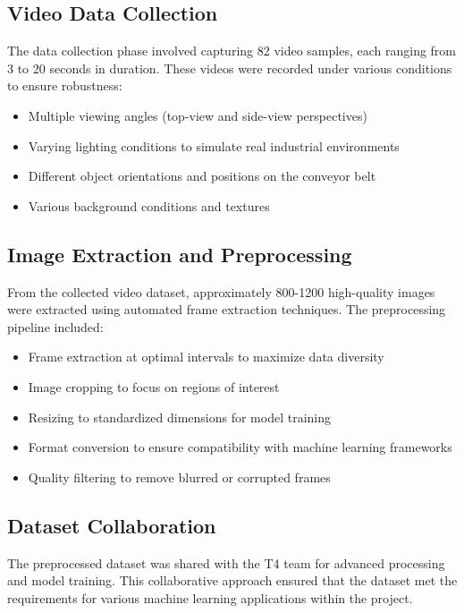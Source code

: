 \documentclass{book}
\begin{document}
\subsection{Video Data Collection}
\par\noindent The data collection phase involved capturing 82 video samples, each ranging from 3 to 20 seconds in duration. These videos were recorded under various conditions to ensure robustness:

\begin{itemize}
\item Multiple viewing angles (top-view and side-view perspectives)
\item Varying lighting conditions to simulate real industrial environments
\item Different object orientations and positions on the conveyor belt
\item Various background conditions and textures
\end{itemize}

\subsection{Image Extraction and Preprocessing}
\par\noindent From the collected video dataset, approximately 800-1200 high-quality images were extracted using automated frame extraction techniques. The preprocessing pipeline included:

\begin{itemize}
\item Frame extraction at optimal intervals to maximize data diversity
\item Image cropping to focus on regions of interest
\item Resizing to standardized dimensions for model training
\item Format conversion to ensure compatibility with machine learning frameworks
\item Quality filtering to remove blurred or corrupted frames
\end{itemize}

\subsection{Dataset Collaboration}
\par\noindent The preprocessed dataset was shared with the T4 team for advanced processing and model training. This collaborative approach ensured that the dataset met the requirements for various machine learning applications within the project.
\end{document}
